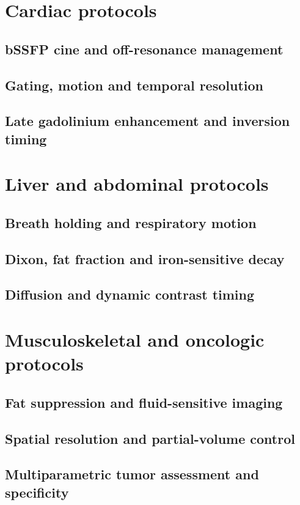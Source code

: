 \section{Cardiac protocols}
\label{sec:23:cardiac-protocols}
\subsection{bSSFP cine and off-resonance management}
\subsection{Gating, motion and temporal resolution}
\subsection{Late gadolinium enhancement and inversion timing}

\section{Liver and abdominal protocols}
\label{sec:23:liver-and-abdominal-protocols}
\subsection{Breath holding and respiratory motion}
\subsection{Dixon, fat fraction and iron-sensitive decay}
\subsection{Diffusion and dynamic contrast timing}

\section{Musculoskeletal and oncologic protocols}
\label{sec:23:musculoskeletal-and-oncologic-protocols}
\subsection{Fat suppression and fluid-sensitive imaging}
\subsection{Spatial resolution and partial-volume control}
\subsection{Multiparametric tumor assessment and specificity}

